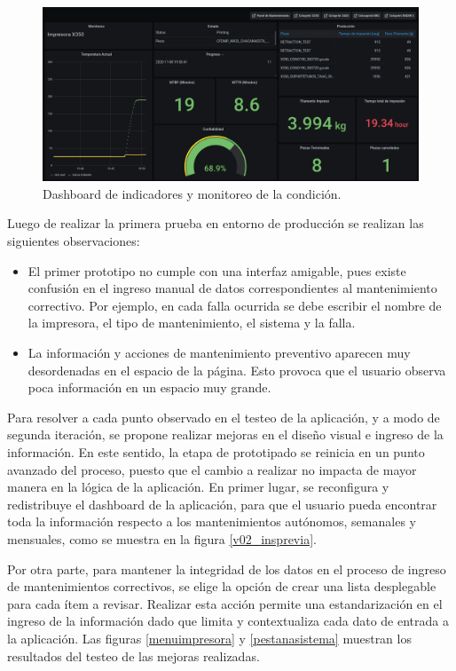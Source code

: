 \begin{figure}[H]
\centering
\includegraphics[scale=0.4,angle=90]{images/grafanaoctocmms.png}
\caption{Dashboard de indicadores y monitoreo de la condición.}
\label{grafanaoctocmms}
\end{figure}

Luego de realizar la primera prueba en entorno de producción se realizan las siguientes observaciones:

\begin{itemize}
\item El primer prototipo no cumple con una interfaz amigable, pues existe confusión en el ingreso manual de datos correspondientes al mantenimiento correctivo. Por ejemplo, en cada falla ocurrida se debe escribir el nombre de la impresora, el tipo de mantenimiento, el sistema y la falla.
\item La información y acciones de mantenimiento preventivo aparecen muy desordenadas en el espacio de la página. Esto provoca que el usuario observa poca información en un espacio muy grande. 
\end{itemize}

Para resolver a cada punto observado en el testeo de la aplicación, y a modo de segunda iteración, se propone realizar mejoras en el diseño visual e ingreso de la información. En este sentido, la etapa de prototipado se reinicia en un punto avanzado del proceso, puesto que el cambio a realizar no impacta de mayor manera en la lógica de la aplicación. En primer lugar, se reconfigura y redistribuye el dashboard de la aplicación, para que el usuario pueda encontrar toda la información respecto a los mantenimientos autónomos, semanales y mensuales, como se muestra en la figura \ref{v02_insprevia}.

Por otra parte, para mantener la integridad de los datos en el proceso de ingreso de mantenimientos correctivos, se elige la opción de crear una lista desplegable para cada ítem a revisar. Realizar esta acción permite una estandarización en el ingreso de la información dado que limita y contextualiza cada dato de entrada a la aplicación. Las figuras \ref{menuimpresora} y \ref{pestanasistema} muestran los resultados del testeo de las mejoras realizadas.


